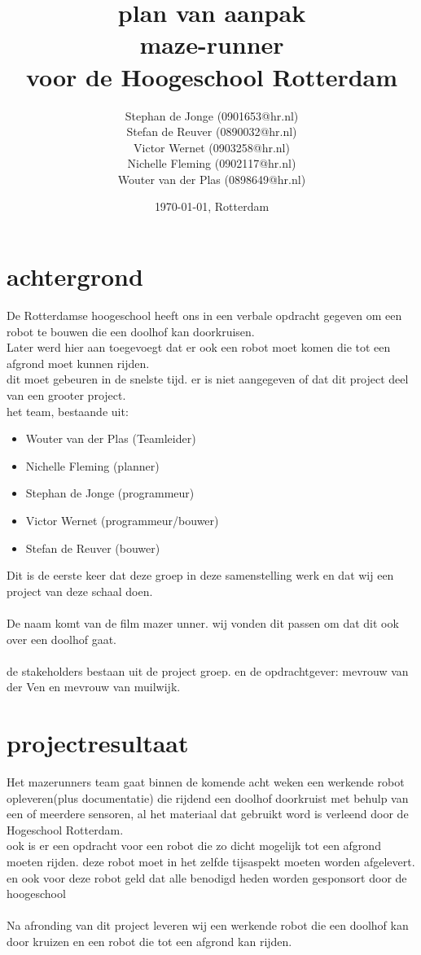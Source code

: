\documentclass[oneside]{book}
\title{plan van aanpak\\
maze-runner\\
\normalsize voor de Hoogeschool Rotterdam
}
\author{
	Stephan de Jonge (0901653@hr.nl)\\
	Stefan de Reuver (0890032@hr.nl)\\
	Victor Wernet (0903258@hr.nl)\\
	Nichelle Fleming (0902117@hr.nl)\\
	Wouter van der Plas (0898649@hr.nl)
}
\date{\today, Rotterdam}
\begin{document}
\maketitle
\tableofcontents


\chapter{achtergrond}

De Rotterdamse hoogeschool heeft ons in een verbale opdracht gegeven om een robot te bouwen die een doolhof kan doorkruisen.\\
Later werd hier aan toegevoegt dat er ook een robot moet komen die tot een afgrond moet kunnen rijden.\\
dit moet gebeuren in de snelste tijd. er is niet aangegeven of dat dit project deel van een grooter project.\\
het team, bestaande uit:\\
\begin{itemize}
	\item Wouter van der Plas (Teamleider)
	\item Nichelle Fleming (planner)
	\item Stephan de Jonge (programmeur)
	\item Victor Wernet (programmeur/bouwer)
	\item Stefan de Reuver (bouwer)
\end{itemize}	
Dit is de eerste keer dat deze groep in deze samenstelling werk en dat wij een project van deze schaal doen.\\
\\
De naam komt van de film mazer unner. wij vonden dit passen om dat dit ook over een doolhof gaat.\\
\\
de stakeholders bestaan uit de project groep. en de opdrachtgever: mevrouw van der Ven en mevrouw van muilwijk.

\clearpage
\chapter{projectresultaat}
Het mazerunners team gaat binnen de komende acht weken een werkende robot opleveren(plus documentatie) die rijdend een doolhof doorkruist met behulp van een of meerdere sensoren, al het materiaal dat gebruikt word is verleend door de Hogeschool Rotterdam.\\
ook is er een opdracht voor een robot die zo dicht mogelijk tot een afgrond moeten rijden. deze robot moet in het zelfde tijsaspekt moeten worden afgelevert. en ook voor deze robot geld dat alle benodigd heden worden gesponsort door de hoogeschool\\
\\
Na afronding van dit project leveren wij een werkende robot die een doolhof kan door kruizen en een robot die tot een afgrond kan rijden.
\clearpage
\end{document}
